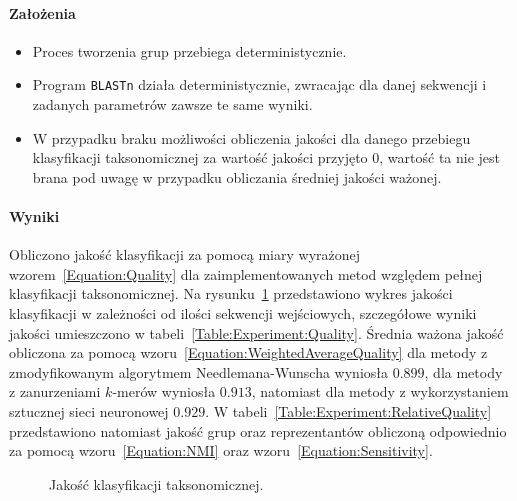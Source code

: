             \paragraph{Założenia}

                \begin{itemize}
                    \item {
                        Proces tworzenia grup przebiega deterministycznie.
                    }
                    \item {
                        Program \texttt{BLASTn} działa deterministycznie, zwracając dla danej sekwencji i zadanych parametrów zawsze te same wyniki.
                    }
                    \item {
                        W przypadku braku możliwości obliczenia jakości dla danego przebiegu klasyfikacji taksonomicznej za wartość jakości przyjęto $0$, wartość ta nie jest brana pod uwagę w przypadku obliczania średniej jakości ważonej.
                    }
                \end{itemize}

            \paragraph{Wyniki}
                Obliczono jakość klasyfikacji za pomocą miary wyrażonej wzorem~\ref{Equation:Quality} dla zaimplementowanych metod względem pełnej klasyfikacji taksonomicznej. Na rysunku~\ref{Picture:Experiment:Quality} przedstawiono wykres jakości klasyfikacji w zależności od ilości sekwencji wejściowych, szczegółowe wyniki jakości umieszczono w tabeli~\ref{Table:Experiment:Quality}. Średnia ważona jakość obliczona za pomocą wzoru~\ref{Equation:WeightedAverageQuality} dla metody z zmodyfikowanym algorytmem Needlemana-Wunscha wyniosła $0.899$, dla metody z zanurzeniami $k$-merów wyniosła $0.913$, natomiast dla metody z wykorzystaniem sztucznej sieci neuronowej $0.929$. W tabeli~\ref{Table:Experiment:RelativeQuality} przedstawiono natomiast jakość grup oraz reprezentantów obliczoną odpowiednio za pomocą wzoru~\ref{Equation:NMI} oraz wzoru~\ref{Equation:Sensitivity}.

                \begin{figure}
                    \begin{center}
                        
                    \end{center}
                    \caption{
                        Jakość klasyfikacji taksonomicznej.
                    }\label{Picture:Experiment:Quality}
                \end{figure}

